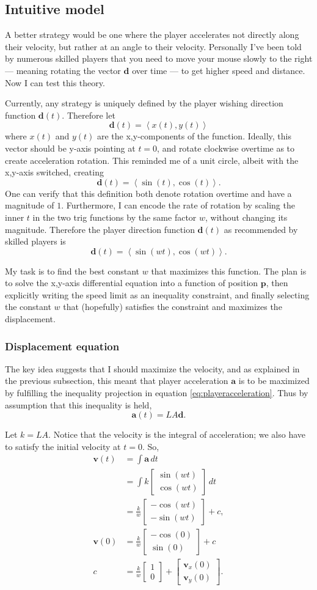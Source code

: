 \documentclass[a4paper,12pt]{article}
\newcommand{\tvec}[1]{\boldsymbol{#1}}
\newcommand{\tang}[1]{\left\langle #1 \right\rangle}
\newcommand{\td}{\tvec{d}}
\newcommand{\ta}{\tvec{a}}
\newcommand{\tv}{\tvec{v}}
\newcommand{\tp}{\tvec{p}}
\newcommand{\tpar}[2]{\begin{bmatrix}#1\\#2 \end{bmatrix}}
\begin{document}
\subsection{Intuitive model}
A better strategy would be one where the player accelerates not directly along their velocity, but rather at an angle to their velocity. Personally I've been told by numerous skilled players that you need to move your mouse slowly to the right --- meaning rotating the vector $\td$ over time --- to get higher speed and distance. Now I can test this theory.

Currently, any strategy is uniquely defined by the player wishing direction function $\td(t)$. Therefore let
\[
    \td(t) = \tang{x(t), y(t)}
\]
where $x(t)$ and $y(t)$ are the x,y-components of the function. Ideally, this vector should be y-axis pointing at $t=0$, and rotate clockwise overtime as to create acceleration rotation. This reminded me of a unit circle, albeit with the x,y-axis switched, creating
\[
    \td(t) = \tang{\sin(t), \cos(t)}.
\]
One can verify that this definition both denote rotation overtime and have a magnitude of $1$. Furthermore, I can encode the rate of rotation by scaling the inner $t$ in the two trig functions by the same factor $w$, without changing its magnitude. Therefore the player direction function $\td(t)$ as recommended by skilled players is
\[
    \td(t) = \tang{\sin(wt), \cos(wt)}.
\]

My task is to find the best constant $w$ that maximizes this function. The plan is to solve the x,y-axis differential equation into a function of position $\tp$, then explicitly writing the speed limit as an inequality constraint, and finally selecting the constant $w$ that (hopefully) satisfies the constraint and maximizes the displacement.

\subsubsection{Displacement equation}
The key idea suggests that I should maximize the velocity, and as explained in the previous subsection, this meant that player acceleration $\ta$ is to be maximized by fulfilling the inequality projection in equation \ref{eq:playeracceleration}. Thus by assumption that this inequality is held,
\[
    \ta(t) = LA\td.
\]

Let $k=LA$. Notice that the velocity is the integral of acceleration; we also have to satisfy the initial velocity at $t=0$. So,
\begin{align*}
    \tv(t) &= \int \ta \, dt\\
    &= \int k \tpar{\sin(wt)}{\cos(wt)} \, dt\\
    &= \frac{k}{w} \tpar{-\cos(wt)}{-\sin(wt)} + c,\\
    \tv(0) &= \frac{k}{w} \tpar{-\cos(0)}{\sin(0)} + c\\
    c &= \frac{k}{w} \tpar{1}{0} + \tpar{\tv_x(0)}{\tv_y(0)}.
\end{align*}
\end{document}
